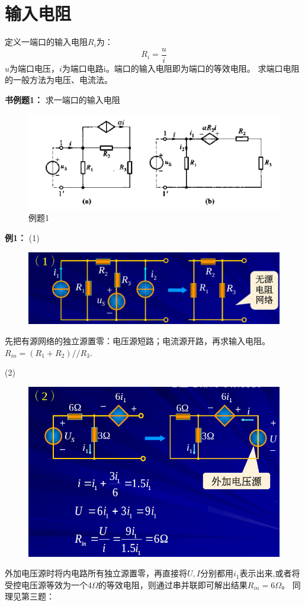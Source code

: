 \documentclass[11pt,a4paper,oneside]{book}
\begin{document}
\section{输入电阻}
定义一端口的输入电阻$R_i$为：
\begin{equation}
	R_i=\frac{u}{i}
\end{equation}
$u$为端口电压，$i$为端口电路i。端口的输入电阻即为端口的等效电阻。
求端口电阻的一般方法为电压、电流法。

\noindent\textbf{书例题1：}
求一端口的输入电阻
\begin{figure}[H]
	\centering
	\includegraphics[width=0.6\linewidth]{screenshot020}
	\caption{例题1}
	\label{fig:screenshot020}
\end{figure}

\noindent\textbf{例1：}
(1)
\begin{figure}[H]
	\centering
	\includegraphics[width=0.6\linewidth]{screenshot026}
	\caption{}
	\label{fig:screenshot026}
\end{figure}
先把有源网络的独立源置零：电压源短路；电流源开路，再求输入电阻。
$R_{in}=(R_1+R_2)//R_3$.

(2)
\begin{figure}[H]
	\centering
	\includegraphics[width=0.6\linewidth]{screenshot027}
	\caption{}
	\label{fig:screenshot027}
\end{figure}
外加电压源时将内电路所有独立源置零，再直接将$U,I$分别都用$i_1$表示出来,或者将受控电压源等效为一个4$\Omega$的等效电阻，则通过串并联即可解出结果$R_{in}=6\Omega$。
同理见第三题：
\end{document}
